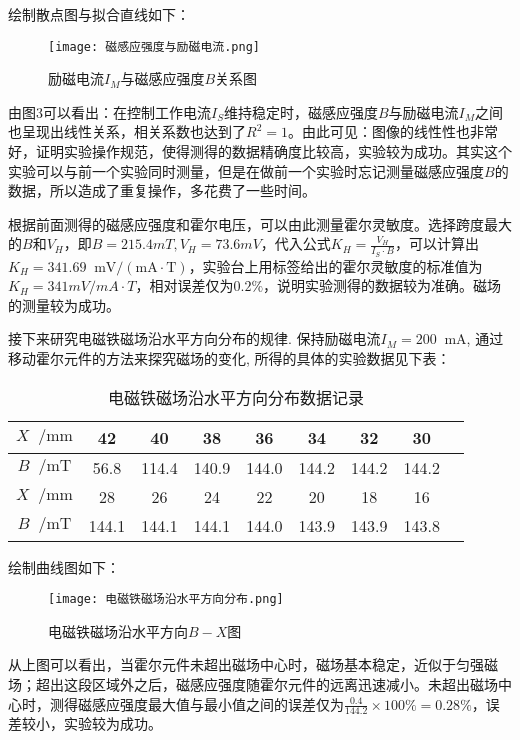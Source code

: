 \documentclass[11pt]{article}
\newcommand*{\unit}[1]{\mathop{}\!\mathrm{#1}}
\begin{document}
绘制散点图与拟合直线如下：

\begin{figure}[H]
  \centering
  \texttt{[image: 磁感应强度与励磁电流.png]}
  \caption{励磁电流$I_M$与磁感应强度$B$关系图}
\end{figure}

由图3可以看出：在控制工作电流$I_S$维持稳定时，磁感应强度$B$与励磁电流$I_M$之间也呈现出线性关系，相关系数也达到了$R^2=1$。由此可见：图像的线性性也非常好，证明实验操作规范，使得测得的数据精确度比较高，实验较为成功。其实这个实验可以与前一个实验同时测量，但是在做前一个实验时忘记测量磁感应强度$B$的数据，所以造成了重复操作，多花费了一些时间。

根据前面测得的磁感应强度和霍尔电压，可以由此测量霍尔灵敏度。选择跨度最大的$B$和$V_H$，即$B = 215.4mT, V_H = 73.6mV$，代入公式$K_H = \frac{V_H}{I_S \cdot B}$，可以计算出$K_H = 341.69 \unit{mV/(mA\cdot T)}$，实验台上用标签给出的霍尔灵敏度的标准值为$K_H=341mV/mA\cdot T$，相对误差仅为$0.2\%$，说明实验测得的数据较为准确。磁场的测量较为成功。

接下来研究电磁铁磁场沿水平方向分布的规律. 保持励磁电流$I_M = 200 \unit{mA}$, 通过移动霍尔元件的方法来探究磁场的变化, 所得的具体的实验数据见下表：

\begin{table}[H]
    \centering
    \caption{电磁铁磁场沿水平方向分布数据记录}
    \begin{tabular}{|c|c|c|c|c|c|c|c|c|}
        \hline
        $X\unit{/mm}$&42&40&38&36&34&32&30\\ \hline
        $B\unit{/mT}$&56.8&114.4&140.9&144.0&144.2&144.2&144.2\\ \hline
        $X\unit{/mm}$&28&26&24&22&20&18&16\\ \hline
        $B\unit{/mT}$&144.1&144.1&144.1&144.0&143.9&143.9&143.8\\ \hline
    \end{tabular}
\end{table}

绘制曲线图如下：

\begin{figure}[H]
  \centering
  \texttt{[image: 电磁铁磁场沿水平方向分布.png]}
  \caption{电磁铁磁场沿水平方向$B-X$图}
\end{figure}

从上图可以看出，当霍尔元件未超出磁场中心时，磁场基本稳定，近似于匀强磁场；超出这段区域外之后，磁感应强度随霍尔元件的远离迅速减小。未超出磁场中心时，测得磁感应强度最大值与最小值之间的误差仅为$\frac{0.4}{144.2} \times 100\% = 0.28 \%$，误差较小，实验较为成功。
\end{document}
